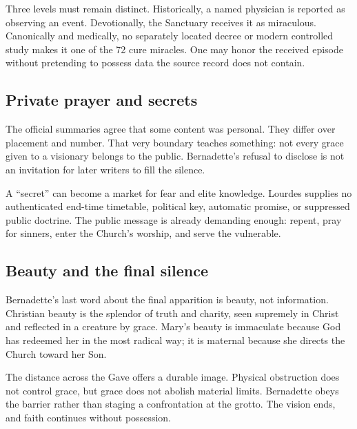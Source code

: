 Three levels must remain distinct. Historically, a named physician is reported as observing an event. Devotionally, the Sanctuary receives it as miraculous. Canonically and medically, no separately located decree or modern controlled study makes it one of the 72 cure miracles. One may honor the received episode without pretending to possess data the source record does not contain.

\subsection{Private prayer and secrets}

The official summaries agree that some content was personal. They differ over placement and number. That very boundary teaches something: not every grace given to a visionary belongs to the public. Bernadette's refusal to disclose is not an invitation for later writers to fill the silence.

A “secret” can become a market for fear and elite knowledge. Lourdes supplies no authenticated end-time timetable, political key, automatic promise, or suppressed public doctrine. The public message is already demanding enough: repent, pray for sinners, enter the Church's worship, and serve the vulnerable.

\subsection{Beauty and the final silence}

Bernadette's last word about the final apparition is beauty, not information. Christian beauty is the splendor of truth and charity, seen supremely in Christ and reflected in a creature by grace. Mary's beauty is immaculate because God has redeemed her in the most radical way; it is maternal because she directs the Church toward her Son.

The distance across the Gave offers a durable image. Physical obstruction does not control grace, but grace does not abolish material limits. Bernadette obeys the barrier rather than staging a confrontation at the grotto. The vision ends, and faith continues without possession.
